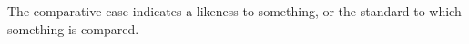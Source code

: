 \documentclass[grammar]{subfiles}
\begin{document}
The comparative case indicates a likeness to something, or the
standard to which something is compared.


% 
% 
% 
\end{document}
